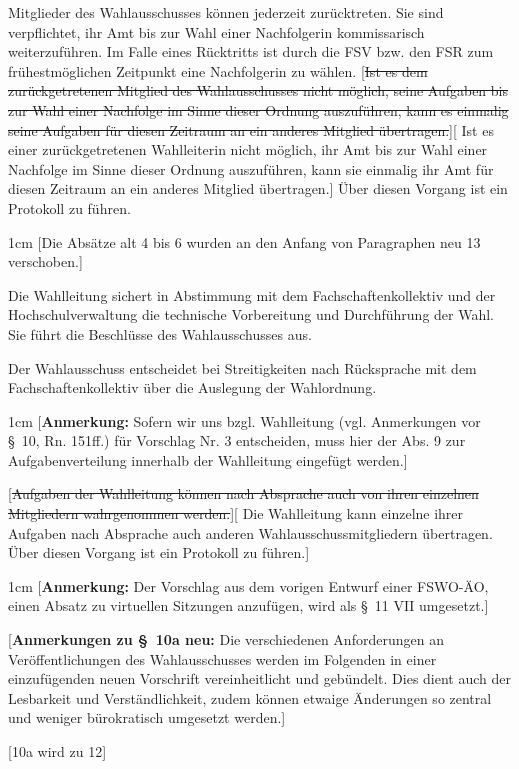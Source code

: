 \documentclass[%
draft,%
multilinesections%
]{fswo}
\newcommand\oldT[1]  {{\color{Gray}[\st{#1}]}}
\newcommand\newT[1]  {{\color{Green}[#1]}}
\newcommand\bemFr[1] {{\color{Red}[#1]}}
\newcommand\bemFe[1] {{\color{Cyan}[#1]}}
\newcommand\remark[1]{\begin{addmargin}{1cm}#1\end{addmargin}}
\newcommand\oldT[1]{}%
\newcommand\newT[1]{#1}
\newcommand\bemFr[1]{}%
\newcommand\bemFe[1]{}%
\newcommand\remark[1]{}
\newcommand\change[2]{\oldT{#1}\newT{#2}}
\begin{document}
\begin{contract}
Mitglieder des Wahlausschusses können jederzeit zurücktreten.
Sie sind verpflichtet, ihr Amt bis zur Wahl einer Nachfolgerin kommissarisch weiterzuführen.
Im Falle eines Rücktritts ist durch die FSV bzw. den FSR zum frühestmöglichen Zeitpunkt eine Nachfolgerin zu wählen.
\change{Ist es dem zurückgetretenen Mitglied des Wahlausschusses nicht möglich, seine Aufgaben bis zur Wahl einer Nachfolge im Sinne dieser Ordnung auszuführen, kann es einmalig seine Aufgaben für diesen Zeitraum an ein anderes Mitglied übertragen.}{%
Ist es einer zurückgetretenen Wahlleiterin nicht möglich, ihr Amt bis zur Wahl einer
Nachfolge im Sinne dieser Ordnung auszuführen, kann sie einmalig ihr Amt für diesen
Zeitraum an ein anderes Mitglied übertragen.}
Über diesen Vorgang ist ein Protokoll zu führen.

\remark{%
\bemFe{Die Absätze alt 4 bis 6 wurden an den Anfang von Paragraphen neu 13 verschoben.}}


Die Wahlleitung sichert in Abstimmung mit dem Fachschaftenkollektiv und der Hochschulverwaltung die technische Vorbereitung und Durchführung der Wahl.
Sie führt die Beschlüsse des Wahlausschusses aus.

Der Wahlausschuss entscheidet bei Streitigkeiten nach Rücksprache mit dem Fachschaftenkollektiv über die Auslegung der Wahlordnung.
%
\remark{%
\bemFr{\textbf{Anmerkung:} Sofern wir uns bzgl. Wahlleitung (vgl. Anmerkungen vor \S~10, Rn. 151ff.) für Vorschlag Nr. 3 entscheiden, muss hier der Abs. 9 zur Aufgabenverteilung innerhalb der Wahlleitung eingefügt werden.}}

\change{Aufgaben der Wahlleitung können nach Absprache auch von ihren einzelnen Mitgliedern wahrgenommen werden.}{%
Die Wahlleitung kann einzelne ihrer Aufgaben nach Absprache auch anderen Wahlausschussmitgliedern übertragen. Über diesen Vorgang ist ein Protokoll zu führen.}
%
\remark{%
\bemFr{\textbf{Anmerkung:} Der Vorschlag aus dem vorigen Entwurf einer FSWO-ÄO, einen Absatz zu virtuellen Sitzungen anzufügen, wird als \S~11 VII umgesetzt.}}
\end{contract}

\bemFr{\textbf{Anmerkungen zu \S~10a neu:}
Die verschiedenen Anforderungen an Veröffentlichungen des Wahlausschusses werden im Folgenden in einer einzufügenden neuen Vorschrift vereinheitlicht und gebündelt.
Dies dient auch der Lesbarkeit und Verständlichkeit, zudem können etwaige Änderungen so zentral und weniger bürokratisch umgesetzt werden.}

\bemFe{10a wird zu 12}
\end{document}
